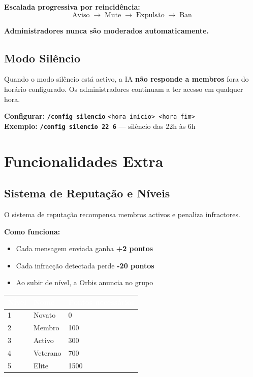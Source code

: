 \documentclass[12pt,a4paper]{article}
\newcommand{\cmd}[1]{\texttt{\textcolor{orbisblue}{\textbf{#1}}}}
\newcommand{\param}[1]{\texttt{\textcolor{orbisMid}{#1}}}
\begin{document}
\textbf{Escalada progressiva por reincidência:}
\[
\text{Aviso} \;\longrightarrow\; \text{Mute} \;\longrightarrow\; \text{Expulsão} \;\longrightarrow\; \text{Ban}
\]

\begin{tcolorbox}[notebox]
\textbf{Administradores nunca são moderados automaticamente.}
\end{tcolorbox}

\subsection{Modo Silêncio}

Quando o modo silêncio está activo, a IA \textbf{não responde a membros} fora do horário configurado. Os administradores continuam a ter acesso em qualquer hora.

\textbf{Configurar:} \cmd{/config silencio} \param{<hora\_início> <hora\_fim>}\\
\textbf{Exemplo:} \cmd{/config silencio 22 6} — silêncio das 22h às 6h


\section{Funcionalidades Extra}
\label{sec:extra}

\subsection{Sistema de Reputação e Níveis}

O sistema de reputação recompensa membros activos e penaliza infractores.

\textbf{Como funciona:}
\begin{itemize}[leftmargin=1.5em, itemsep=2pt]
  \item Cada mensagem enviada ganha \textbf{+2 pontos}
  \item Cada infracção detectada perde \textbf{-20 pontos}
  \item Ao subir de nível, a Orbis anuncia no grupo
\end{itemize}

\begin{center}
\begin{tabular}{C{1.5cm} L{3cm} C{3cm}}
\toprule
{}\textcolor{white}{\textbf{Nível}} & \textcolor{white}{\textbf{Nome}} & \textcolor{white}{\textbf{Pontos necessários}} \\
 & Novato & 0 \\
2 & Membro & 100 \\
3 & Activo & 300 \\
4 & Veterano & 700 \\
5 & Elite & 1500 \\
\bottomrule
\end{tabular}
\end{center}
\end{document}
